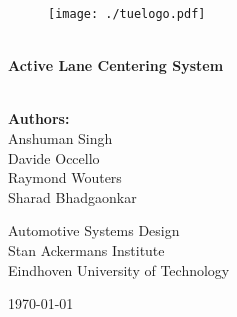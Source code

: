 \documentclass[
11pt, %
english, %
singlespacing, %
]{MastersDoctoralThesis} %
\author{ASD Group ALC} %
\begin{document}
\frontmatter %

\pagestyle{plain} %


\begin{titlepage}
\begin{center}

\begin{figure}[ht!]

\begin{center}
\texttt{[image: ./tuelogo.pdf]}
\end{center}
\end{figure}

\vspace*{30pt}

\HRule \\[0.5cm] %
{\huge \bfseries Active Lane Centering System}\\[0.4cm] %
\HRule \\[2cm] %


\vspace*{60pt}



\begin{flushleft} \large
\begin{tabbing}
{\bf Authors:}\\
Anshuman Singh\\
Davide Occello\\
Raymond Wouters \\
Sharad Bhadgaonkar\\
\end{tabbing}
\end{flushleft}




\begin{flushleft} \large
Automotive Systems Design \\
Stan Ackermans Institute \\
Eindhoven University of Technology \\
\end{flushleft}

\begin{flushleft} \large
\today
\end{flushleft}

 
\vfill
\end{center}
\end{titlepage}
\end{document}

